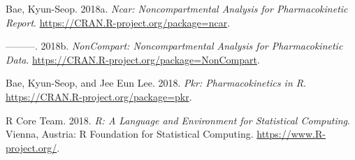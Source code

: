 \documentclass[9pt,]{krantz}
\begin{document}
\hypertarget{refs}{}
\leavevmode\hypertarget{ref-R-ncar}{}%
Bae, Kyun-Seop. 2018a. \emph{Ncar: Noncompartmental Analysis for Pharmacokinetic Report}. \url{https://CRAN.R-project.org/package=ncar}.

\leavevmode\hypertarget{ref-R-NonCompart}{}%
---------. 2018b. \emph{NonCompart: Noncompartmental Analysis for Pharmacokinetic Data}. \url{https://CRAN.R-project.org/package=NonCompart}.

\leavevmode\hypertarget{ref-R-pkr}{}%
Bae, Kyun-Seop, and Jee Eun Lee. 2018. \emph{Pkr: Pharmacokinetics in R}. \url{https://CRAN.R-project.org/package=pkr}.

\leavevmode\hypertarget{ref-R-base}{}%
R Core Team. 2018. \emph{R: A Language and Environment for Statistical Computing}. Vienna, Austria: R Foundation for Statistical Computing. \url{https://www.R-project.org/}.
\end{document}
